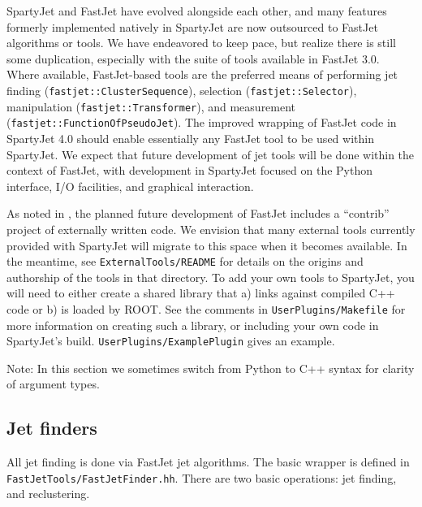 \documentclass{article}
\newcommand{\prog}[1]{{\sc #1}\xspace}
\newcommand{\code}[1]{{\tt #1}\xspace}
\newcommand{\SJ}[0]{\prog{SpartyJet}}
\newcommand{\FJ}[0]{\prog{FastJet}}
\begin{document}
\SJ and \FJ have evolved alongside each other, and many features formerly implemented natively in \SJ are now outsourced to \FJ algorithms or tools.  We have endeavored to keep pace, but realize there is still some duplication, especially with the suite of tools available in \FJ 3.0.  Where available, \FJ-based tools are the preferred means of performing jet finding (\code{fastjet::ClusterSequence}), selection (\code{fastjet::Selector}), manipulation (\code{fastjet::Transformer}), and measurement (\code{fastjet::FunctionOfPseudoJet}).  The improved wrapping of \FJ code in \SJ 4.0 should enable essentially any \FJ tool to be used within \SJ.  We expect that future development of jet tools will be done within the context of \FJ, with development in \SJ focused on the Python interface, I/O facilities, and graphical interaction.

As noted in \cite{FastJetManual}, the planned future development of \FJ includes a ``contrib'' project of externally written code.  We envision that many external tools currently provided with \SJ will migrate to this space when it becomes available.  In the meantime, see \verb+ExternalTools/README+ for details on the origins and authorship of the tools in that directory.  To add your own tools to \SJ, you will need to either create a shared library that a) links against compiled C++ code or b) is loaded by ROOT.  See the comments in \verb+UserPlugins/Makefile+ for more information on creating such a library, or including your own code in \SJ's build.  \verb+UserPlugins/ExamplePlugin+ gives an example.

Note: In this section we sometimes switch from Python to C++ syntax for clarity of argument types.

\subsection{Jet finders}
\label{FastJetFinder}
All jet finding is done via \FJ jet algorithms.  The basic wrapper is defined in \verb+FastJetTools/FastJetFinder.hh+.  There are two basic operations: jet finding, and reclustering.
\end{document}
